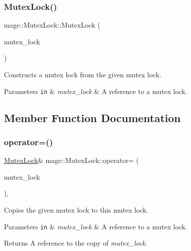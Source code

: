 \subsubsection{\texorpdfstring{Mutex\+Lock()}{MutexLock()}\hspace{0.1cm}{\footnotesize\ttfamily [2/2]}}
{\footnotesize\ttfamily mage\+::\+Mutex\+Lock\+::\+Mutex\+Lock (\begin{DoxyParamCaption}\item[{const \hyperlink{structmage_1_1_mutex_lock}{Mutex\+Lock} \&}]{mutex\+\_\+lock }\end{DoxyParamCaption})\hspace{0.3cm}{\ttfamily [private]}}

Constructs a mutex lock from the given mutex lock.


\begin{DoxyParams}[1]{Parameters}
\mbox{\tt in}  & {\em mutex\+\_\+lock} & A reference to a mutex lock. \\
\hline
\end{DoxyParams}


\subsection{Member Function Documentation}
\hypertarget{structmage_1_1_mutex_lock_a739909161a9a9ca0fc8143ac84967765}{}\label{structmage_1_1_mutex_lock_a739909161a9a9ca0fc8143ac84967765} 
\subsubsection{\texorpdfstring{operator=()}{operator=()}}
{\footnotesize\ttfamily \hyperlink{structmage_1_1_mutex_lock}{Mutex\+Lock}\& mage\+::\+Mutex\+Lock\+::operator= (\begin{DoxyParamCaption}\item[{const \hyperlink{structmage_1_1_mutex_lock}{Mutex\+Lock} \&}]{mutex\+\_\+lock }\end{DoxyParamCaption})\hspace{0.3cm}{\ttfamily [private]}, {\ttfamily [delete]}}

Copies the given mutex lock to this mutex lock.


\begin{DoxyParams}[1]{Parameters}
\mbox{\tt in}  & {\em mutex\+\_\+lock} & A reference to a mutex lock. \\
\hline
\end{DoxyParams}
\begin{DoxyReturn}{Returns}
A reference to the copy of {\itshape mutex\+\_\+lock}. 
\end{DoxyReturn}


